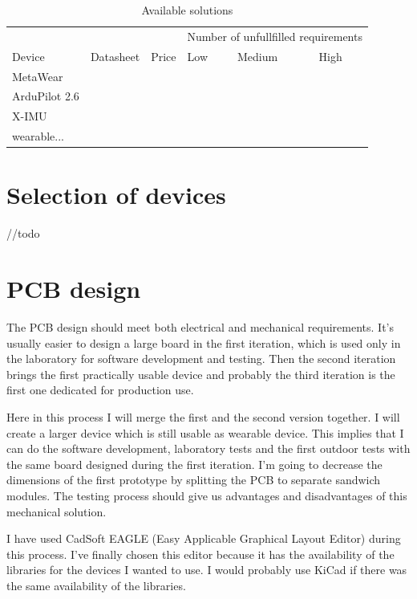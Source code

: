 \begin{table}[H]
\centering
\caption{Available solutions}
\label{tab:availableSolutions}
\begin{tabular}{|l|l|l|l|l|l|}
\hline
       & & & \multicolumn{3}{|c|}{Number of unfullfilled requirements} \\
Device & Datasheet & Price & Low & Medium & High \\\hline\hline

MetaWear &  &  &  &  &  \\
ArduPilot 2.6 &  &  &  &  &  \\
X-IMU &  &  &  &  &  \\
wearable... &  &  &  &  &  \\\hline
\end{tabular}
\end{table}

\section{Selection of devices}
\label{HWdeviceSelection}
//todo



\section{PCB design}
\label{HWpcbDesign}
The PCB design should meet both electrical and mechanical requirements. It's usually easier to design a large board in the first iteration, which is used only in the laboratory for software development and testing. Then the second iteration brings the first practically usable device and probably the third iteration is the first one dedicated for production use.

Here in this process I will merge the first and the second version together. I will create a larger device which is still usable as wearable device. This implies that I can do the software development, laboratory tests and the first outdoor tests with the same board designed during the first iteration. I'm going to decrease the dimensions of the first prototype by splitting the PCB to separate sandwich modules. The testing process should give us advantages and disadvantages of this mechanical solution.

I have used CadSoft EAGLE (Easy Applicable Graphical Layout Editor) \cite{EAGLE} during this process. I've finally chosen this editor because it has the availability of the libraries for the devices I wanted to use. I would probably use KiCad \cite{KiCad} if there was the same availability of the libraries.

